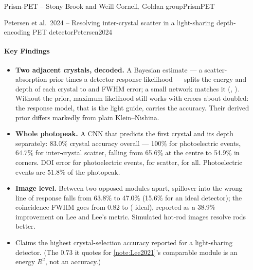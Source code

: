 \begin{programnote}{Prism-PET -- Stony Brook and Weill Cornell, Goldan group}{PrismPET}
\begin{papernote}{Petersen et al.\ 2024 -- Resolving inter-crystal scatter in a light-sharing depth-encoding PET detector}{Petersen2024}
\paragraph{Key Findings}
\begin{itemize}
	\item \textbf{Two adjacent crystals, decoded.} A Bayesian estimate --- a
		scatter-absorption prior times a detector-response likelihood ---
		splits the energy and depth of each crystal to  and
		 FWHM error; a small network matches it (,
		). Without the prior, maximum likelihood still works with
		errors about doubled: the response model, that is the light guide,
		carries the accuracy. Their derived prior differs markedly from plain
		Klein--Nishina.
	\item \textbf{Whole photopeak.} A CNN that predicts the first crystal and its
		depth separately: 83.0\% crystal accuracy overall --- 100\% for
		photoelectric events, 64.7\% for inter-crystal scatter, falling from
		65.6\% at the centre to 54.9\% in corners. DOI error  for
		photoelectric events,  for scatter,  for all.
		Photoelectric events are 51.8\% of the photopeak.
	\item \textbf{Image level.} Between two opposed modules  apart,
		spillover into the wrong line of response falls from 63.8\% to 47.0\%
		(15.6\% for an ideal detector); the coincidence FWHM goes from 0.82 to
		 ( ideal), reported as a 38.9\% improvement on Lee and
		Lee's metric. Simulated hot-rod images resolve  rods better.
	\item Claims the highest crystal-selection accuracy reported for a
		light-sharing detector. (The 0.73 it quotes for \ref{note:Lee2021}'s
		comparable module is an energy $R^2$, not an accuracy.)
\end{itemize}


\end{papernote}
\end{programnote}
